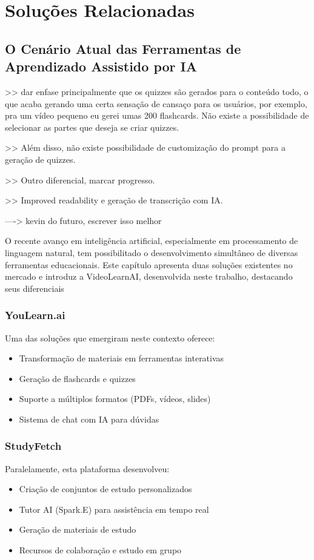 \documentclass[tcc,capa]{texufpel}
\begin{document}
\chapter{Soluções Relacionadas}

\section{O Cenário Atual das Ferramentas de Aprendizado Assistido por IA}


>> dar enfase principalmente que os quizzes são gerados para o conteúdo todo, o que acaba gerando uma certa sensação de cansaço para os usuários, por exemplo, pra um vídeo pequeno eu gerei umas 200 flashcards. Não existe a possibilidade de selecionar as partes que deseja se criar quizzes.

>> Além disso, não existe possibilidade de customização do prompt para a geração de quizzes.

>> Outro diferencial, marcar progresso. 

>> Improved readability e geração de transcrição com IA.

----> kevin do futuro, escrever isso melhor

O recente avanço em inteligência artificial, especialmente em processamento de linguagem natural, tem possibilitado o desenvolvimento simultâneo de diversas ferramentas educacionais. Este capítulo apresenta duas soluções existentes no mercado e introduz a VideoLearnAI, desenvolvida neste trabalho, destacando seus diferenciais

\subsection{YouLearn.ai}
Uma das soluções que emergiram neste contexto oferece:
\begin{itemize}
    \item Transformação de materiais em ferramentas interativas
    \item Geração de flashcards e quizzes
    \item Suporte a múltiplos formatos (PDFs, vídeos, slides)
    \item Sistema de chat com IA para dúvidas
\end{itemize}

\subsection{StudyFetch}
Paralelamente, esta plataforma desenvolveu:
\begin{itemize}
    \item Criação de conjuntos de estudo personalizados
    \item Tutor AI (Spark.E) para assistência em tempo real
    \item Geração de materiais de estudo
    \item Recursos de colaboração e estudo em grupo
\end{itemize}
\end{document}
